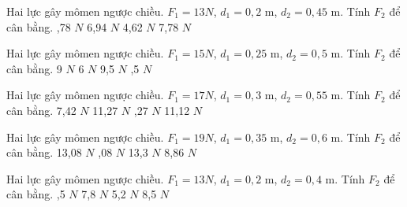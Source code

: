 \begin{ex}
Hai lực gây mômen ngược chiều. $F_1=13N$, $d_1=0,2$ m, $d_2=0,45$ m. Tính $F_2$ để cân bằng.
\choice
{,78 $N$}
{6,94 $N$}
{4,62 $N$}
{7,78 $N$}
\end{ex}

\begin{ex}
Hai lực gây mômen ngược chiều. $F_1=15N$, $d_1=0,25$ m, $d_2=0,5$ m. Tính $F_2$ để cân bằng.
\choice
{9 $N$}
{6 $N$}
{9,5 $N$}
{,5 $N$}
\end{ex}

\begin{ex}
Hai lực gây mômen ngược chiều. $F_1=17N$, $d_1=0,3$ m, $d_2=0,55$ m. Tính $F_2$ để cân bằng.
\choice
{7,42 $N$}
{11,27 $N$}
{,27 $N$}
{11,12 $N$}
\end{ex}

\begin{ex}
Hai lực gây mômen ngược chiều. $F_1=19N$, $d_1=0,35$ m, $d_2=0,6$ m. Tính $F_2$ để cân bằng.
\choice
{13,08 $N$}
{,08 $N$}
{13,3 $N$}
{8,86 $N$}
\end{ex}

\begin{ex}
Hai lực gây mômen ngược chiều. $F_1=13N$, $d_1=0,2$ m, $d_2=0,4$ m. Tính $F_2$ để cân bằng.
\choice
{,5 $N$}
{7,8 $N$}
{5,2 $N$}
{8,5 $N$}
\end{ex}


